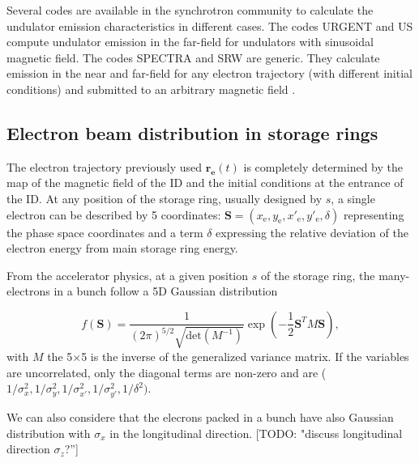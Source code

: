 \documentclass{iucr}              %
\newcommand{\todo}[1]{{\color{red}[TODO: "#1'']}}
\begin{document}
Several codes are available in the synchrotron community to calculate the undulator emission characteristics in different cases. The codes URGENT \cite{codeURGENT} and US  compute undulator emission in the far-field for undulators with sinusoidal magnetic field. The codes SPECTRA \cite{codeSPECTRA} and SRW \cite{codeSRW} are generic. They calculate emission in the near and far-field for any electron trajectory (with different initial conditions) and submitted to an arbitrary magnetic field \cite{Chubar1995}.

\subsection{Electron beam distribution in storage rings}
\label{sec:electronbeam}


The electron trajectory previously used $\textbf{r}_{\textbf{e}}(t)$ is completely determined by the map of the magnetic field of the ID and the initial conditions at the entrance of the ID. 
At any position of the storage ring, usually designed by $s$, a single electron can be described by 5 coordinates:
$\textbf{S}= (x_\text{e},y_\text{e},  x'_\text{e},y'_\text{e},\delta)$ representing the phase space coordinates and a term $\delta$ expressing the relative deviation of the electron energy from main storage ring energy. 

From the accelerator physics, at a given position $s$ of the storage ring, the many-electrons in a bunch follow a 5D Gaussian distribution

\begin{equation}\label{eq:f-electrons}
f(\textbf{S}) = \frac{1}{(2 \pi)^{5/2} \sqrt{\text{det}(M^{-1})}} \exp
        \left( -\frac{1}{2} \textbf{S}^T M \textbf{S} \right),
\end{equation}
with $M$ the 5$\times$5 is the inverse of the generalized variance matrix. If the variables are uncorrelated, only the diagonal terms are non-zero and are ($1/\sigma_x^2,1/\sigma_y^2,1/\sigma_{x'}^2,1/\sigma_{y'}^2,1/\delta^2)$. 

We can also considere that the elecrons packed in a bunch have also Gaussian distribution with $\sigma_x$ in the longitudinal direction. 
\todo{discuss longitudinal direction $\sigma_z$?}

 
\end{document}
